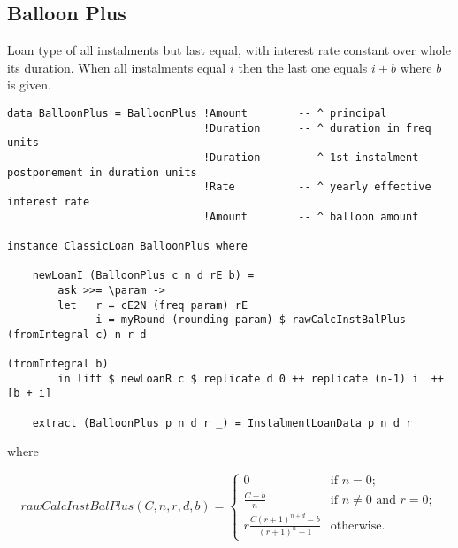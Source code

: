 \documentclass[letterpaper,11pt]{article}
\begin{document}
\subsection{Balloon Plus}
Loan type of all instalments but last equal, with interest rate constant over whole its duration.
When all instalments equal $i$ then the last one equals $i+b$ where $b$ is given.

{\small
\begin{verbatim}
data BalloonPlus = BalloonPlus !Amount        -- ^ principal
                               !Duration      -- ^ duration in freq units
                               !Duration      -- ^ 1st instalment postponement in duration units
                               !Rate          -- ^ yearly effective interest rate
                               !Amount        -- ^ balloon amount

instance ClassicLoan BalloonPlus where

    newLoanI (BalloonPlus c n d rE b) =
        ask >>= \param ->
        let   r = cE2N (freq param) rE
              i = myRound (rounding param) $ rawCalcInstBalPlus (fromIntegral c) n r d
                                                                      (fromIntegral b)
        in lift $ newLoanR c $ replicate d 0 ++ replicate (n-1) i  ++ [b + i]

    extract (BalloonPlus p n d r _) = InstalmentLoanData p n d r
\end{verbatim}
}

where

\begin{equation}
rawCalcInstBalPlus (C, n, r, d, b) = \left\{ \begin{array}{ll}
                                    0 & \mbox{if $n=0$};\\
                                    \frac{C-b}{n}& \mbox{if $n \neq 0$ and $r=0$};\\
                                    r \frac{C(r+1)^{n+d}-b}{(r+1)^{n}- 1} & \mbox{otherwise}.
                                    \end{array} \right.
\end{equation}
\end{document}
